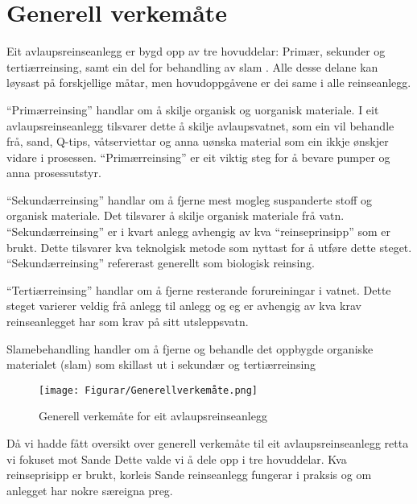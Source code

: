 \section{Generell verkemåte}

Eit avlaupsreinseanlegg er bygd opp av tre hovuddelar: Primær, sekunder og tertiærreinsing,
samt ein del for behandling av slam \citep{Regjeriga}.
Alle desse delane kan løysast på forskjellige måtar, men hovudoppgåvene er dei same
i alle reinseanlegg.

``Primærreinsing'' handlar om å skilje organisk og uorganisk materiale.
I eit avlaupsreinseanlegg tilsvarer dette å skilje avlaupsvatnet, 
som ein vil behandle frå, sand, Q-tips, våtserviettar
og anna uønska material som ein ikkje ønskjer vidare i prosessen.\newline
``Primærreinsing'' er eit viktig steg for å bevare pumper og anna prosessutstyr.

``Sekundærreinsing'' handlar om å fjerne mest mogleg suspanderte stoff og organisk materiale.
Det tilsvarer å skilje organisk materiale frå vatn.
``Sekundærreinsing'' er i kvart anlegg avhengig av kva ``reinseprinsipp'' som er brukt. Dette tilsvarer
kva teknolgisk metode som nyttast for å utføre dette steget.
``Sekundærreinsing'' refererast generellt som biologisk reinsing.

``Tertiærreinsing'' handlar om å fjerne resterande forureiningar i vatnet.
Dette steget varierer veldig frå anlegg til anlegg og eg er
avhengig av kva krav reinseanlegget har som krav på sitt utsleppsvatn.

Slamebehandling handler om å fjerne og behandle det oppbygde organiske materialet (slam)
som skillast ut i sekundær og tertiærreinsing 

\begin{figure}[htbp]
    \centering
    \texttt{[image: Figurar/Generellverkemåte.png]}
    \caption{Generell verkemåte for eit avlaupsreinseanlegg}\label{fig:GenerellVerkemåte}
\end{figure}

Då vi hadde fått oversikt over generell verkemåte til eit avlaupsreinseanlegg retta vi fokuset mot Sande
Dette valde vi å dele opp i tre hovuddelar. Kva reinseprisipp er brukt, korleis Sande reinseanlegg
fungerar i praksis og om anlegget har nokre særeigna preg.
